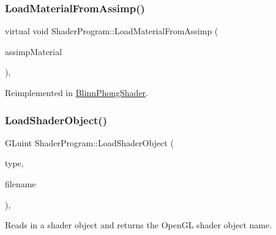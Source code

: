\hypertarget{class_shader_program_a51ac6fbf3a3d88643eef303a4c3a1fa8}{}\label{class_shader_program_a51ac6fbf3a3d88643eef303a4c3a1fa8}
\subsubsection{\texorpdfstring{Load\+Material\+From\+Assimp()}{LoadMaterialFromAssimp()}}
{\footnotesize\ttfamily virtual void Shader\+Program\+::\+Load\+Material\+From\+Assimp (\begin{DoxyParamCaption}\item[{std\+::shared\+\_\+ptr$<$ struct ai\+Material $>$}]{assimp\+Material }\end{DoxyParamCaption})\hspace{0.3cm}{\ttfamily [inline]}, {\ttfamily [virtual]}}



Reimplemented in \hyperlink{class_blinn_phong_shader_a5a2a720a403f3d005b07a96fee35b95b}{Blinn\+Phong\+Shader}.

\hypertarget{class_shader_program_ab5c50c33203cf65b7f6ffe00d2243d5a}{}\label{class_shader_program_ab5c50c33203cf65b7f6ffe00d2243d5a}
\subsubsection{\texorpdfstring{Load\+Shader\+Object()}{LoadShaderObject()}}
{\footnotesize\ttfamily G\+Luint Shader\+Program\+::\+Load\+Shader\+Object (\begin{DoxyParamCaption}\item[{G\+Lenum}]{type,  }\item[{const std\+::string \&}]{filename }\end{DoxyParamCaption})\hspace{0.3cm}{\ttfamily [static]}, {\ttfamily [protected]}}



Reads in a shader object and returns the Open\+GL shader object name.


